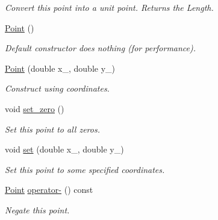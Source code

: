 \begin{DoxyCompactItemize}
\begin{DoxyCompactList}\small\item\em Convert this point into a unit point. Returns the Length. \end{DoxyCompactList}\item 
\mbox{\label{structp2t_1_1Point_a7e573e8b3c263b088a2141d4977850b7}} 
\hyperlink{structp2t_1_1Point_a7e573e8b3c263b088a2141d4977850b7}{Point} ()
\begin{DoxyCompactList}\small\item\em Default constructor does nothing (for performance). \end{DoxyCompactList}\item 
\mbox{\label{structp2t_1_1Point_a27500926f38f6b3672374722e11b1309}} 
\hyperlink{structp2t_1_1Point_a27500926f38f6b3672374722e11b1309}{Point} (double x\+\_\+, double y\+\_\+)
\begin{DoxyCompactList}\small\item\em Construct using coordinates. \end{DoxyCompactList}\item 
\mbox{\label{structp2t_1_1Point_ac0b05395a17be952b6ea580495c9d11b}} 
void \hyperlink{structp2t_1_1Point_ac0b05395a17be952b6ea580495c9d11b}{set\+\_\+zero} ()
\begin{DoxyCompactList}\small\item\em Set this point to all zeros. \end{DoxyCompactList}\item 
\mbox{\label{structp2t_1_1Point_aa8a3a62cc47e65e0f717679adf12fd4e}} 
void \hyperlink{structp2t_1_1Point_aa8a3a62cc47e65e0f717679adf12fd4e}{set} (double x\+\_\+, double y\+\_\+)
\begin{DoxyCompactList}\small\item\em Set this point to some specified coordinates. \end{DoxyCompactList}\item 
\mbox{\label{structp2t_1_1Point_a0d5817d4ea8de01e587e4c1d54925046}} 
\hyperlink{structp2t_1_1Point}{Point} \hyperlink{structp2t_1_1Point_a0d5817d4ea8de01e587e4c1d54925046}{operator-\/} () const
\begin{DoxyCompactList}\small\item\em Negate this point. \end{DoxyCompactList}\item 

\end{DoxyCompactItemize}
